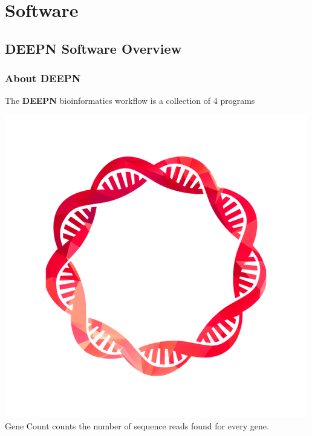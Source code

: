 \documentclass[11pt,fleqn]{book} %
\newcommand{\GeneCount}{{\color{Red} Gene Count }}
\newcommand{\DEEPN}{\textbf{DEEPN }}
\begin{document}
\part{Software}



\chapter{DEEPN Software Overview}

\section{About DEEPN}
The \DEEPN bioinformatics workflow is a collection of 4 programs

\includegraphics[scale=0.3]{Pictures/gene_count.png} \GeneCount counts the number of sequence reads found for every gene.\\
\end{document}
